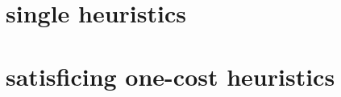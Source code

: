 \section{single heuristics}
\label{sec:orgheadline1}

\section{satisficing one-cost heuristics}
\label{sec:orgheadline2}
